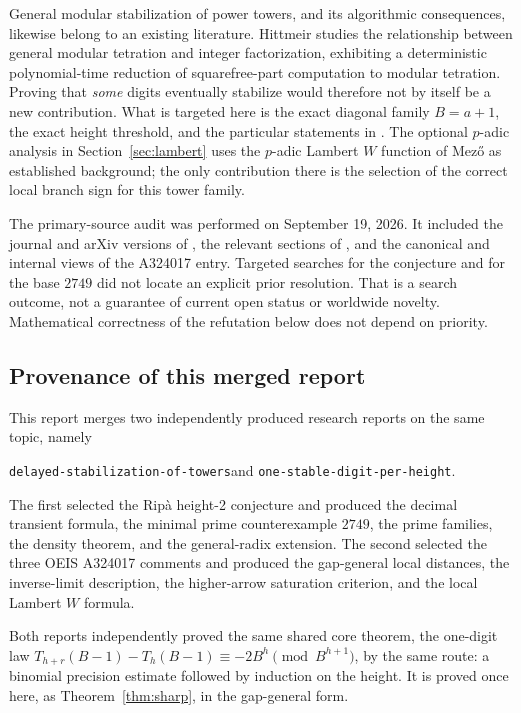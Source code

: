 \documentclass[11pt,letterpaper]{article}
\numberwithin{equation}{section}
\theoremstyle{definition}
\theoremstyle{remark}
\begin{document}
General modular stabilization of power towers, and its algorithmic consequences, likewise belong to an existing literature. Hittmeir \cite{hittmeir} studies the relationship between general modular tetration and integer factorization, exhibiting a deterministic polynomial-time reduction of squarefree-part computation to modular tetration. Proving that \emph{some} digits eventually stabilize would therefore not by itself be a new contribution. What is targeted here is the exact diagonal family $B=a+1$, the exact height threshold, and the particular statements in \cite{OEIS324017}. The optional $p$-adic analysis in Section~\ref{sec:lambert} uses the $p$-adic Lambert $W$ function of Mez\H{o} \cite{mezo} as established background; the only contribution there is the selection of the correct local branch sign for this tower family.

The primary-source audit was performed on September 19, 2026. It included the journal and arXiv versions of \cite{Ripa2021}, the relevant sections of \cite{RipaOnnis2022}, and the canonical and internal views of the A324017 entry. Targeted searches for the conjecture and for the base $2749$ did not locate an explicit prior resolution. That is a search outcome, not a guarantee of current open status or worldwide novelty. Mathematical correctness of the refutation below does not depend on priority.

\subsection{Provenance of this merged report}\label{sec:provenance}

This report merges two independently produced research reports on the same topic, namely
\begin{center}
\texttt{delayed-stabilization-of-towers}\quad and \quad\texttt{one-stable-digit-per-height}.
\end{center}
The first selected the Rip\`a height-2 conjecture and produced the decimal transient formula, the minimal prime counterexample $2749$, the prime families, the density theorem, and the general-radix extension. The second selected the three OEIS A324017 comments and produced the gap-general local distances, the inverse-limit description, the higher-arrow saturation criterion, and the local Lambert $W$ formula.

Both reports independently proved the same shared core theorem, the one-digit law
$T_{h+r}(B-1)-T_h(B-1)\equiv-2B^h\pmod{B^{h+1}}$, by the same route: a binomial precision estimate followed by induction on the height. It is proved once here, as Theorem~\ref{thm:sharp}, in the gap-general form.
\end{document}
